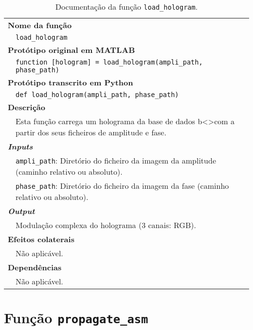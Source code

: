 \begin{table}[!hp]
    \centering
    \caption[Documentação da função \texttt{load\_hologram}]{Documentação da função \texttt{load\_hologram}\cite{Gilles2018}.}
    \label{tab:load_hologram}
    \begin{tabular}{p{1cm} p{11.5cm}}
        \hline
        \multicolumn{2}{l}{\bfseries\small Nome da função}\\
         & \verb|load_hologram|\\
        \hline
        \multicolumn{2}{l}{\bfseries\small Protótipo original em MATLAB}\\
         & \texttt{function [hologram] = load_hologram(ampli_path, phase_path)}\\
        \hline
        \multicolumn{2}{l}{\bfseries\small Protótipo transcrito em Python}\\
         & \texttt{def load_hologram(ampli_path, phase_path)} \\
        \hline\multicolumn{2}{l}{\bfseries\small Descrição}\\
         & Esta função carrega um holograma da base de dados b<>com a partir dos seus ficheiros de amplitude e fase.\\
        \hline\multicolumn{2}{l}{\bfseries\small \textit{Inputs}}\\
         & \verb|ampli_path|: Diretório do ficheiro da imagem da amplitude (caminho relativo ou absoluto).\\
         & \verb|phase_path|: Diretório do ficheiro da imagem da fase (caminho relativo ou absoluto).\\
        \hline\multicolumn{2}{l}{\bfseries\small \textit{Output}}\\
         & Modulação complexa do holograma (3 canais: \ac{RGB}).\\
        \hline\multicolumn{2}{l}{\bfseries\small Efeitos colaterais}\\
         & Não aplicável. \\
        \hline\multicolumn{2}{l}{\bfseries\small Dependências}\\
         & Não aplicável. \\
        \hline
    \end{tabular}
\end{table}


\newpage
\section{Função \texttt{propagate\_asm}}
\label{sec::doc-codigo:propagate_asm}


